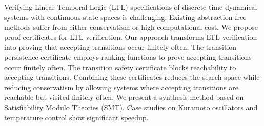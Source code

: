 Verifying Linear Temporal Logic (LTL) specifications of discrete-time dynamical systems with continuous state spaces is challenging. Existing abstraction-free methods suffer from either conservatism or high computational cost. We propose proof certificates for LTL verification. Our approach transforms LTL verification into proving that accepting transitions occur finitely often. The transition persistence certificate employs ranking functions to prove accepting transitions occur finitely often. The transition safety certificate blocks reachability to accepting transitions. Combining these certificates reduces the search space while reducing conservatism by allowing systems where accepting transitions are reachable but visited finitely often. We present a synthesis method based on Satisfiability Modulo Theories (SMT). Case studies on Kuramoto oscillators and temperature control show significant speedup.
